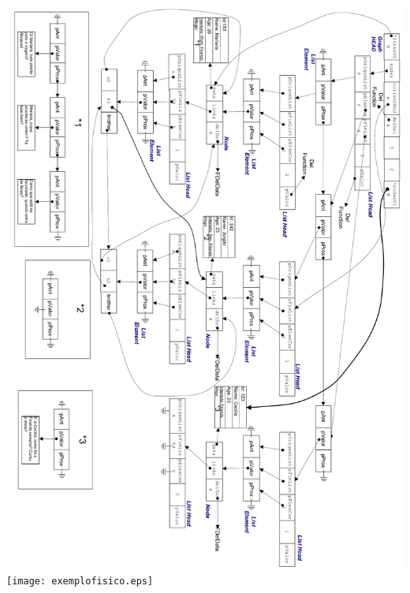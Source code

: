 \documentclass[a4paper,8pt]{article}
\begin{document}
\ifpdf
\includegraphics[width=\linewidth]{exemplofisico.pdf}
\else
\texttt{[image: exemplofisico.eps]}
\fi
\end{document}
